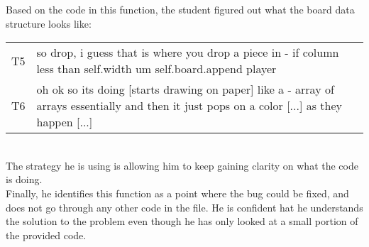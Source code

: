Based on the code in this function, the student figured out what the board data structure looks like: \\
\begin{tabular}{lp{13cm}}
T5& so drop, i guess that is where you drop a piece in - if column less than self.width um self.board.append player \\
T6&oh ok so its doing  [starts drawing on paper] like a - array of arrays essentially and then it just pops on a color [...] as they happen [...] \\
\end{tabular}\\
The strategy he is using is allowing him to keep gaining clarity on what the code is doing. \\

Finally, he identifies this function as a point where the bug could be fixed, and does not go through any other code in the file. 
He is confident hat he understands the solution to the problem even though he has only looked at a small portion of the provided code. 



